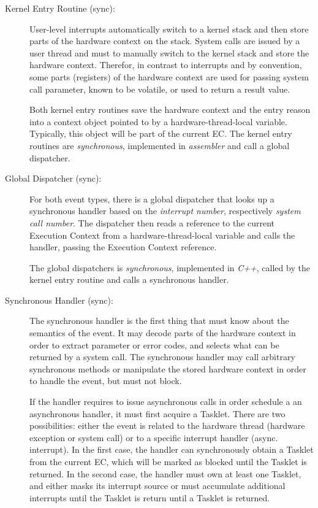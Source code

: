 \begin{description}

\item[Kernel Entry Routine (sync):]
User-level interrupts automatically switch to a kernel stack and then store parts of the hardware context on the stack.
System calls are issued by a user thread and must to manually switch to the kernel stack and store the hardware context. Therefor, in contrast to interrupts and by convention, some parts (registers) of the hardware context are used for passing system call parameter, known to be volatile, or used to return a result value.

Both kernel entry routines save the hardware context and the entry reason into a context object pointed to by a hardware-thread-local variable. Typically, this object will be part of the current EC.
The kernel entry routines are \emph{synchronous}, implemented in \emph{assembler} and call a global dispatcher.

\item[Global Dispatcher (sync):]
For both event types, there is a global dispatcher that looks up a synchronous handler based on the \emph{interrupt number}, respectively \emph{system call number}.
The dispatcher then reads a reference to the current Execution Context from a hardware-thread-local variable and calls the handler, passing the Execution Context reference.

The global dispatchers is \emph{synchronous}, implemented in \emph{C++}, called by the kernel entry routine and calls a synchronous handler.

\item[Synchronous Handler (sync):]
The synchronous handler is the first thing that must know about the semantics of the event. It may decode parts of the hardware context in order to extract parameter or error codes, and selects what can be returned by a system call. The synchronous handler may call arbitrary synchronous methods or manipulate the stored hardware context in order to handle the event, but must not block.

If the handler requires to issue asynchronous calls in order schedule a an asynchronous handler, it must first acquire a Tasklet. There are two possibilities: either the event is related to the hardware thread (hardware exception or system call) or to a specific interrupt handler (async. interrupt).
In the first case, the handler can synchronously obtain a Tasklet from the current EC, which will be marked as blocked until the Tasklet is returned.
In the second case, the handler must own at least one Tasklet, and either masks its interrupt source or must accumulate additional interrupts until the Tasklet is return until a Tasklet is returned.


\end{description}
